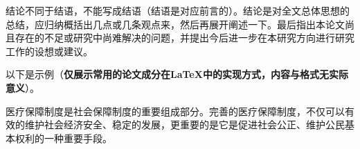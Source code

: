 
\begin{conclusion}

结论不同于结语，不能写成结语（结语是对应前言的）。结论是对全文总体思想的总结，应归纳概括出几点或几条观点来，然后再展开阐述一下。最后指出本论文尚且存在的不足或研究中尚难解决的问题，并提出今后进一步在本研究方向进行研究工作的设想或建议。

以下是示例（{\bf 仅展示常用的论文成分在LaTeX中的实现方式，内容与格式无实际意义}）。

医疗保障制度是社会保障制度的重要组成部分。完善的医疗保障制度，不仅可以有效的维护社会经济安全、稳定的发展，更重要的是它是促进社会公正、维护公民基本权利的一种重要手段。

\end{conclusion}


